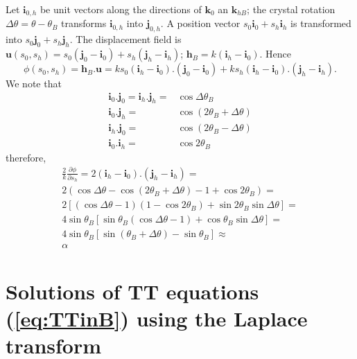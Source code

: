 \documentclass[preprint]{iucr}              %
\begin{document}
Let $\textbf{i}_{0,h}$ be unit vectors along the directions of $\textbf{k}_0$ an $\textbf{k}_{hB}$; the crystal rotation $\Delta\theta=\theta-\theta_B$ transforms $\textbf{i}_{0,h}$ into $\textbf{j}_{0,h}$. A position vector $s_0\textbf{i}_0+s_h\textbf{i}_h$ is transformed into $s_0\textbf{j}_0+s_h\textbf{j}_h$. The displacement field is $\textbf{u}(s_0,s_h)=s_0(\textbf{j}_0-\textbf{i}_0)+ s_h(\textbf{j}_h-\textbf{i}_h)$; $\textbf{h}_B=k(\textbf{i}_h-\textbf{i}_0)$. Hence
\begin{equation}
    \phi(s_0,s_h)=\textbf{h}_B.\textbf{u}=k s_0(\textbf{i}_h-\textbf{i}_0).(\textbf{j}_0-\textbf{i}_0) + 
    k s_h(\textbf{i}_h-\textbf{i}_0).(\textbf{j}_h-\textbf{i}_h).
\end{equation}
We note that 
\begin{subequations}
\begin{align}
    \textbf{i}_0.\textbf{j}_0=\textbf{i}_h.\textbf{j}_h=&\cos\Delta\theta_B \\
    \textbf{i}_0.\textbf{j}_h=&\cos(2\theta_B +\Delta\theta) \\
    \textbf{i}_h.\textbf{j}_0=&\cos(2\theta_B -\Delta\theta) \\
    \textbf{i}_0.\textbf{i}_h=&\cos2\theta_B
\end{align}
\end{subequations}
therefore, 
\begin{subequations}
\begin{align}
    \frac{2}{k}\frac{\partial\phi}{\partial s_h} =  2(\textbf{i}_h-\textbf{i}_0).(\textbf{j}_h-\textbf{i}_h)= \nonumber\\
    2(\cos\Delta\theta - \cos(2\theta_B+\Delta\theta)-1+\cos2\theta_B)= \nonumber\\
    2[(\cos\Delta\theta-1)(1-\cos2\theta_B)+\sin2\theta_B\sin\Delta\theta]=\nonumber\\
    4 \sin\theta_B[\sin\theta_B(\cos\Delta\theta-1)+\cos\theta_B\sin\Delta\theta]=\nonumber\\
    4 \sin\theta_B[\sin(\theta_B+\Delta\theta)-\sin\theta_B]\approx\nonumber\\
    \alpha
\end{align}
\end{subequations}



\section{Solutions of TT equations (\ref{eq:TTinB}) using the Laplace transform}
\label{appendix:laplace}
\end{document}
